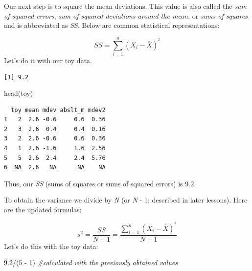 \documentclass[
  11pt,
]{book}
\newenvironment{Shaded}{\begin{snugshade}}{\end{snugshade}}
\newcommand{\AttributeTok}[1]{\textcolor[rgb]{0.77,0.63,0.00}{#1}}
\newcommand{\CommentTok}[1]{\textcolor[rgb]{0.56,0.35,0.01}{\textit{#1}}}
\newcommand{\ConstantTok}[1]{\textcolor[rgb]{0.00,0.00,0.00}{#1}}
\newcommand{\DecValTok}[1]{\textcolor[rgb]{0.00,0.00,0.81}{#1}}
\newcommand{\FloatTok}[1]{\textcolor[rgb]{0.00,0.00,0.81}{#1}}
\newcommand{\FunctionTok}[1]{\textcolor[rgb]{0.00,0.00,0.00}{#1}}
\newcommand{\NormalTok}[1]{#1}
\newcommand{\OtherTok}[1]{\textcolor[rgb]{0.56,0.35,0.01}{#1}}
\newcommand{\SpecialCharTok}[1]{\textcolor[rgb]{0.00,0.00,0.00}{#1}}
\begin{document}
Our next step is to square the mean deviations. This value is also called the \emph{sum of squared errors}, \emph{sum of squared deviations around the mean}, or \emph{sums of squares} and is abbreviated as \emph{SS}. Below are common statistical representations:

\[SS = \sum_{i=1}^{n}(X_{i} - \bar{X})^{^{2}}\]
Let's do it with our toy data.

\begin{Shaded}
\end{Shaded}

\begin{verbatim}
[1] 9.2
\end{verbatim}

\begin{Shaded}
\begin{Highlighting}[]
\FunctionTok{head}\NormalTok{(toy)}
\end{Highlighting}
\end{Shaded}

\begin{verbatim}
  toy mean mdev abslt_m mdev2
1   2  2.6 -0.6     0.6  0.36
2   3  2.6  0.4     0.4  0.16
3   2  2.6 -0.6     0.6  0.36
4   1  2.6 -1.6     1.6  2.56
5   5  2.6  2.4     2.4  5.76
6  NA  2.6   NA      NA    NA
\end{verbatim}

Thus, our \emph{SS} (sums of squares or sums of squared errors) is 9.2.

To obtain the variance we divide by \emph{N} (or \emph{N} - 1; described in later lessons). Here are the updated formulas:

\[s^{2}=\frac{SS}{N-1}=\frac{\sum_{i=1}^{n}(X_{i} - \bar{X})^{^{2}}}{N-1}\]
Let's do this with the toy data:

\begin{Shaded}
\begin{Highlighting}[]
\FloatTok{9.2}\SpecialCharTok{/}\NormalTok{(}\DecValTok{5} \SpecialCharTok{{-}} \DecValTok{1}\NormalTok{)  }\CommentTok{\#calculated with the previously obtained values}
\end{Highlighting}
\end{Shaded}
\end{document}
